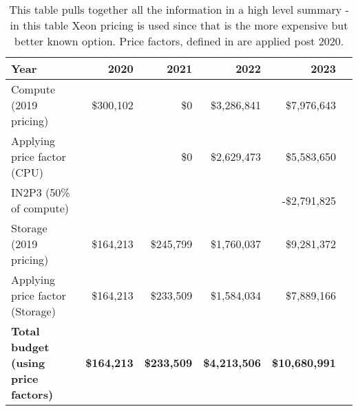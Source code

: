 \tiny \begin{longtable} { |p{}  |r  |r  |r  |r  |r |} 
\caption{This table pulls together all the information in a high level summary - in this table Xeon pricing is used since that is the more expensive but better known option. Price factors, defined in  are applied post 2020.
 \label{tab:Summary}}\\ 
\hline 
\textbf{Year}&\textbf{2020}&\textbf{2021}&\textbf{2022}&\textbf{2023} \\ \hline
{Compute (2019 pricing)}&{\$300,102}&{\$0}&{\$3,286,841}&{\$7,976,643} \\ \hline
{Applying price factor (CPU)}&{}&{\$0}&{\$2,629,473}&{\$5,583,650} \\ \hline
{IN2P3 (50\% of compute)}&{}&{}&{}&{-\$2,791,825} \\ \hline
{Storage (2019 pricing)}&{\$164,213}&{\$245,799}&{\$1,760,037}&{\$9,281,372} \\ \hline
{Applying price factor (Storage)}&{\$164,213}&{\$233,509}&{\$1,584,034}&{\$7,889,166} \\ \hline
\textbf{Total budget (using price factors)}&\textbf{\$164,213}&\textbf{\$233,509}&\textbf{\$4,213,506}&\textbf{\$10,680,991} \\ \hline
\end{longtable} \normalsize
